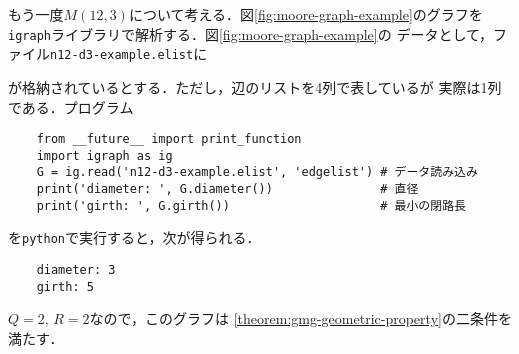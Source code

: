 \begin{example}
  もう一度$M(12,3)$について考える．図\ref{fig:moore-graph-example}のグラフを
  \verb|igraph|ライブラリで解析する．図\ref{fig:moore-graph-example}の
  データとして，ファイル\verb|n12-d3-example.elist|に
  \begin{multicols}{4}
    
  \end{multicols}
  が格納されているとする．ただし，辺のリストを4列で表しているが
  実際は1列である．プログラム
  \begin{verbatim}
    from __future__ import print_function
    import igraph as ig
    G = ig.read('n12-d3-example.elist', 'edgelist') # データ読み込み
    print('diameter: ', G.diameter())               # 直径
    print('girth: ', G.girth())                     # 最小の閉路長
  \end{verbatim}
  を\verb|python|で実行すると，次が得られる．
  \begin{verbatim}
    diameter: 3
    girth: 5
  \end{verbatim}
  $Q=2,\,R=2$なので，このグラフは
  \ref{theorem:gmg-geometric-property}の二条件を満たす．
\end{example}
